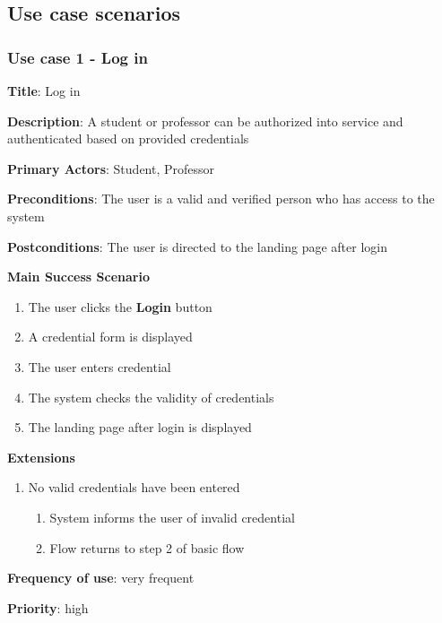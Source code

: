 \documentclass[singlespacing,12pt,parskip,headsepline,consistentlayout]{article}
\begin{document}
\subsection{Use case scenarios}

\subsubsection{Use case 1 - Log in}
\begin{flushleft}

\vspace{0.2cm}
\hline
\vspace{0.2cm}
{\bfseries Title}: {Log in}

{\bfseries Description}: {A student or professor can be authorized into service and authenticated based on provided credentials}

{\bfseries Primary Actors}: {Student, Professor}

{\bfseries Preconditions}: The user is a valid and verified person who has access to the system

{\bfseries Postconditions}: {The user is directed to the landing page after login}

{\bfseries Main Success Scenario}

\begin{enumerate}
      \item The user clicks the {\bfseries Login} button
  \item A credential form is displayed
  \item The user enters credential
  \item The system checks the validity of credentials
  \item The landing page after login is displayed
\end{enumerate}
 
{\bfseries Extensions}

\begin{enumerate}
  \item No valid credentials have been entered
  \begin{enumerate}
      \item System informs the user of invalid credential
      \item Flow returns to step 2 of basic flow
  \end{enumerate}
\end{enumerate}

{\bfseries Frequency of use}: very frequent

{\bfseries Priority}: high

\end{flushleft}
\end{document}
